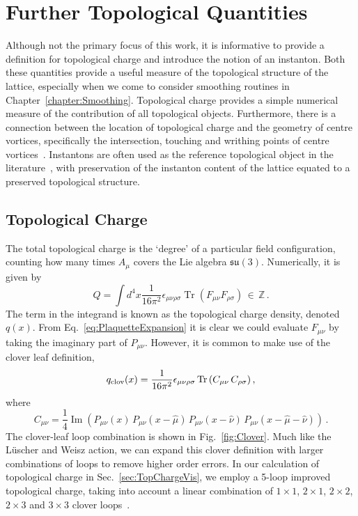 \section{Further Topological Quantities}
Although not the primary focus of this work, it is informative to  provide a definition for topological charge and introduce the notion of an instanton. Both these quantities provide a useful measure of the topological structure of the lattice, especially when we come to consider smoothing routines in Chapter~\ref{chapter:Smoothing}. Topological charge provides a simple numerical measure of the contribution of all topological objects. Furthermore, there is a connection between the location of topological charge and the geometry of centre vortices, specifically the intersection, touching and writhing points of centre vortices~\cite{Spengler:2018dxt,Reinhardt:2001kf}. Instantons are often used as the reference topological object in the literature~\cite{Moran:2008ra,Trewartha:2015ida}, with preservation of the instanton content of the lattice equated to a preserved topological structure.

\subsection{Topological Charge}\label{sec:TopQ}
The total topological charge is the `degree' of a particular field configuration, counting how many times $A_\mu$ covers the Lie algebra $\mathfrak{su}(3)$. Numerically, it is given by~\cite{Alexandrou:2017hqw}
%
\begin{equation}
Q = \int d^4x \frac { 1 } { 16 \pi ^ { 2 } } \epsilon _ { \mu \nu \rho \sigma } \operatorname { Tr } \left( F _ { \mu \nu } F _ { \rho \sigma } \right)\, \in\, \mathbb{Z} \, .
\label{eq:TopologicalCharge}
\end{equation} 
The term in the integrand is known as the topological charge density, denoted $q(x)$. From Eq.~\ref{eq:PlaquetteExpansion} it is clear we could evaluate $F_{\mu\nu}$ by taking the imaginary part of $P_{\mu\nu}$. However, it is common to make use of the clover leaf definition,
%
\begin{equation}
q_\text{clov}(x) = \frac{1}{16\pi^2} \epsilon _ { \mu \nu \rho \sigma } \operatorname{Tr}\left(C_{\mu\nu} \, C_{\rho\sigma}\right),
\end{equation}
%
where
\begin{equation}
C_{\mu\nu} = \frac{1}{4} \operatorname{Im}\left(P_{\mu\nu}(x) \, P_{\mu\nu}(x-\hat{\mu}) \, P_{\mu\nu}(x - \hat{\nu}) \, P_{\mu\nu}(x - \hat{\mu} - \hat{\nu})\right)\, .
\end{equation}
%
The clover-leaf loop combination is shown in Fig.~\ref{fig:Clover}. Much like the L\"uscher and Weisz action, we can expand this clover definition with larger combinations of loops to remove higher order errors. In our calculation of topological charge in Sec.~\ref{sec:TopChargeVis}, we employ a 5-loop improved topological charge, taking into account a linear combination of $1\times 1$, $2\times 1$, $2\times 2$, $2\times 3$ and $3\times 3$ clover loops~\cite{BilsonThompson:2001ca}.

